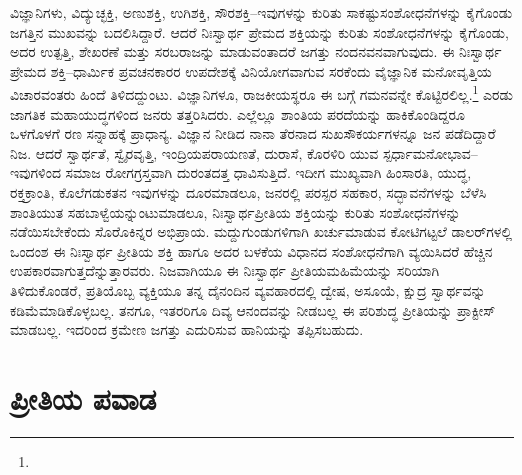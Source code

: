 ವಿಜ್ಞಾನಿಗಳು, ವಿದ್ಯುಚ್ಛಕ್ತಿ, ಅಣುಶಕ್ತಿ, ಉಗಿಶಕ್ತಿ, ಸೌರಶಕ್ತಿ–ಇವುಗಳನ್ನು ಕುರಿತು ಸಾಕಷ್ಟು\break ಸಂಶೋಧನೆಗಳನ್ನು ಕೈಗೊಂಡು ಜಗತ್ತಿನ ಮುಖವನ್ನು ಬದಲಿಸಿದ್ದಾರೆ. ಆದರೆ ನಿಃಸ್ವಾರ್ಥ ಪ್ರೇಮದ ಶಕ್ತಿಯನ್ನು ಕುರಿತು ಸಂಶೋಧನೆಗಳನ್ನು ಕೈಗೊಂಡು, ಅದರ ಉತ್ಪತ್ತಿ, ಶೇಖರಣೆ ಮತ್ತು ಸರಬರಾಜನ್ನು ಮಾಡುವಂತಾದರೆ ಜಗತ್ತು ನಂದನವನವಾಗುವುದು. ಈ ನಿಃಸ್ವಾರ್ಥ ಪ್ರೇಮದ ಶಕ್ತಿ–ಧಾರ್ಮಿಕ ಪ್ರವಚನಕಾರರ ಉಪದೇಶಕ್ಕೆ ವಿನಿಯೋಗವಾಗುವ ಸರಕೆಂದು ವೈಜ್ಞಾನಿಕ ಮನೋ\-ವೃತ್ತಿಯ ವಿಚಾರವಂತರು ಹಿಂದೆ ತಿಳಿದದ್ದುಂಟು. ವಿಜ್ಞಾನಿಗಳೂ, ರಾಜಕೀಯಸ್ಥರೂ ಈ ಬಗ್ಗೆ ಗಮನವನ್ನೇ ಕೊಟ್ಟಿರಲಿಲ್ಲ.\footnote{\hfill{}} ಎರಡು ಜಾಗತಿಕ ಮಹಾಯುದ್ಧಗಳಿಂದ ಜನರು ತತ್ತರಿಸಿದರು. ಎಲ್ಲೆಲ್ಲೂ ಶಾಂತಿಯ ಪರದೆಯನ್ನು ಹಾಕಿಕೊಂಡಿದ್ದರೂ ಒಳಗೊಳಗೆ ರಣ ಸನ್ನಾಹಕ್ಕೆ ಪ್ರಾಧಾನ್ಯ. ವಿಜ್ಞಾನ ನೀಡಿದ ನಾನಾ ತೆರನಾದ ಸುಖಸೌಕರ್ಯಗಳನ್ನೂ ಜನ ಪಡೆದಿದ್ದಾರೆ ನಿಜ. ಆದರೆ ಸ್ವಾರ್ಥತೆ, ಸ್ವೈರವೃತ್ತಿ, ಇಂದ್ರಿಯಪರಾಯಣತೆ, ದುರಾಸೆ, ಕೊರಳಿರಿ ಯುವ ಸ್ಪರ್ಧಾಮನೋ\-ಭಾವ–ಇವುಗಳಿಂದ ಸಮಾಜ ರೋಗಗ್ರಸ್ತವಾಗಿ ದುರಂತದತ್ತ ಧಾವಿಸುತ್ತಿದೆ. ಇದೀಗ ಮುಖ್ಯವಾಗಿ ಹಿಂಸಾರತಿ, ಯುದ್ಧ, ರಕ್ತಕ್ರಾಂತಿ, ಕೊಲೆಗಡುಕತನ ಇವುಗಳನ್ನು ದೂರಮಾಡಲೂ, ಜನರಲ್ಲಿ ಪರಸ್ಪರ ಸಹಕಾರ, ಸದ್ಭಾವನೆಗಳನ್ನು ಬೆಳೆಸಿ ಶಾಂತಿಯುತ ಸಹಬಾಳ್ವೆಯನ್ನುಂಟುಮಾಡಲೂ, ನಿಃಸ್ವಾರ್ಥಪ್ರೀತಿಯ ಶಕ್ತಿಯನ್ನು ಕುರಿತು ಸಂಶೋಧನೆಗಳನ್ನು ನಡೆಯಿಸಬೇಕೆಂದು ಸೊರೊಕಿನ್ನರ ಅಭಿಪ್ರಾಯ. ಮದ್ದುಗುಂಡುಗಳಿಗಾಗಿ ಖರ್ಚುಮಾಡುವ ಕೋಟಿಗಟ್ಟಲೆ ಡಾಲರ್​ಗಳಲ್ಲಿ ಒಂದಂಶ ಈ ನಿಃಸ್ವಾರ್ಥ ಪ್ರೀತಿಯ ಶಕ್ತಿ ಹಾಗೂ ಅದರ ಬಳಕೆಯ ವಿಧಾನದ ಸಂಶೋಧನೆಗಾಗಿ ವ್ಯಯಿಸಿದರೆ ಹೆಚ್ಚಿನ ಉಪಕಾರವಾಗುತ್ತದೆನ್ನುತ್ತಾರವರು. ನಿಜವಾಗಿಯೂ ಈ ನಿಃಸ್ವಾರ್ಥ ಪ್ರೀತಿಯ\break ಮಹಿಮೆಯನ್ನು ಸರಿಯಾಗಿ ತಿಳಿದುಕೊಂಡರೆ, ಪ್ರತಿಯೊಬ್ಬ ವ್ಯಕ್ತಿಯೂ ತನ್ನ ದೈನಂದಿನ ವ್ಯವಹಾರದಲ್ಲಿ ದ್ವೇಷ, ಅಸೂಯೆ, ಕ್ಷುದ್ರ ಸ್ವಾರ್ಥವನ್ನು ಕಡಿಮೆಮಾಡಿಕೊಳ್ಳಬಲ್ಲ. ತನಗೂ, ಇತರರಿಗೂ ದಿವ್ಯ ಆನಂದವನ್ನು ನೀಡಬಲ್ಲ ಈ ಪರಿಶುದ್ಧ ಪ್ರೀತಿಯನ್ನು ಪ್ರಾಕ್ಟೀಸ್ ಮಾಡಬಲ್ಲ. ಇದರಿಂದ ಕ್ರಮೇಣ ಜಗತ್ತು ಎದುರಿಸುವ ಹಾನಿಯನ್ನು ತಪ್ಪಿಸಬಹುದು.


\section*{ಪ್ರೀತಿಯ ಪವಾಡ}


